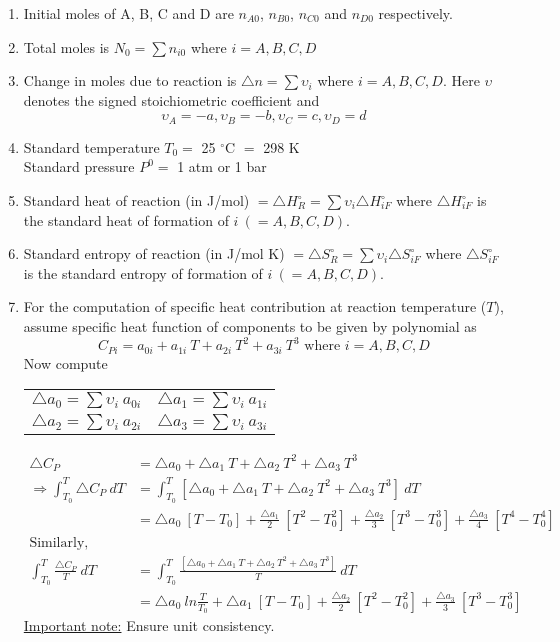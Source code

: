 \documentclass[a4paper,10pt]{article}
\begin{document}
\begin{enumerate}
    \item Initial moles of A, B, C and D are $n_{A0}$, $n_{B0}$, $n_{C0}$ and $n_{D0}$ respectively.
    
    \item Total moles is $N_0 = \sum n_{i0}$ where $i = A,B,C,D$
    
    \item Change in moles due to reaction is $\triangle n = \sum \upsilon_i$ where $i = A,B,C,D$. Here $\upsilon$ denotes the signed stoichiometric coefficient and $$\upsilon_A=-a, \upsilon_B=-b, \upsilon_C=c, \upsilon_D=d$$
    
    \item Standard temperature $T_0 = $ 25 $^{\circ}$C $=$ 298 K\\Standard pressure  $P^0 = $ 1 atm or 1 bar
    
    \item Standard heat of reaction (in J/mol) $= \triangle H_R^{\circ} = \sum \upsilon_i \triangle H_{iF}^{\circ}$ where $\triangle H_{iF}^{\circ}$ is the standard heat of formation of $i \ (=A,B,C,D)$. 
    
    \item Standard entropy of reaction (in J/mol K) $= \triangle S_R^{\circ} = \sum \upsilon_i \triangle S_{iF}^{\circ}$ where $\triangle S_{iF}^{\circ}$ is the standard entropy of formation of $i \ (=A,B,C,D)$. 
    
    \item For the computation of specific heat contribution at reaction temperature ($T$), assume specific heat function of components to be given by polynomial as $$C_{Pi}=a_{0i} + a_{1i}\ T +a_{2i}\ T^2 +a_{3i}\ T^3 \text{ where } i=A,B,C,D$$Now compute
    \begin{tabular}{cc}
    $\triangle a_0 = \sum \upsilon_i\ a_{0i}$ & $\triangle a_1 = \sum \upsilon_i\ a_{1i}$ \\
    $\triangle a_2 = \sum \upsilon_i\ a_{2i}$ & $\triangle a_3 = \sum \upsilon_i\ a_{3i}$ 
    \end{tabular}
     \begin{align*} 
        \triangle C_{P}&=\triangle a_0 + \triangle a_1\ T+ \triangle a_2\ T^2+ \triangle a_3\ T^3\\
        \Rightarrow   \int_{T_0}^{T} \triangle C_P\ dT &=\int_{T_0}^{T} [\triangle a_0 + \triangle a_1\ T+ \triangle a_2\ T^2+ \triangle a_3\ T^3]\ dT\\
        &= \triangle a_0\ [T-T_0]+ \frac{\triangle a_1}{2}\ [T^2-T_0^2]+\frac{\triangle a_2}{3}\ [T^3-T_0^3]+\frac{\triangle a_3}{4}\ [T^4-T_0^4]\\
        \text{Similarly,}\\
        \int_{T_0}^{T} \frac{\triangle C_P}{T}\ dT &=\int_{T_0}^{T} \frac{[\triangle a_0 + \triangle a_1\ T+ \triangle a_2\ T^2+ \triangle a_3\ T^3]}{T}\ dT\\
        &=\triangle a_0\  ln\frac{T}{T_0} + \triangle a_1\ [T-T_0]+ \frac{\triangle a_2}{2}\ [T^2-T_0^2]+ \frac{\triangle a_3}{3}\ [T^3-T_0^3]
    \end{align*}
    \underline{Important note:} Ensure unit consistency.
    

\end{enumerate}
\end{document}
